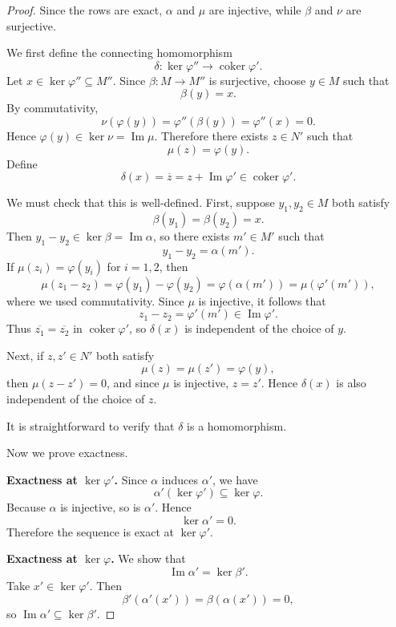 \begin{proof}
    Since the rows are exact, $\alpha$ and $\mu$ are injective, while $\beta$ and $\nu$ are surjective.

    We first define the connecting homomorphism
    \[
        \delta:\ker\varphi''\to \operatorname{coker}\varphi'.
    \]
    Let $x\in \ker\varphi''\subseteq M''$. Since $\beta:M\to M''$ is surjective, choose $y\in M$ such that
    \[
        \beta(y)=x.
    \]
    By commutativity,
    \[
        \nu(\varphi(y))=\varphi''(\beta(y))=\varphi''(x)=0.
    \]
    Hence $\varphi(y)\in \ker\nu=\operatorname{Im}\mu$. Therefore there exists $z\in N'$ such that
    \[
        \mu(z)=\varphi(y).
    \]
    Define
    \[
        \delta(x)=\overline{z}=z+\operatorname{Im}\varphi' \in \operatorname{coker}\varphi'.
    \]

    We must check that this is well-defined. First, suppose $y_1,y_2\in M$ both satisfy
    \[
        \beta(y_1)=\beta(y_2)=x.
    \]
    Then $y_1-y_2\in \ker\beta=\operatorname{Im}\alpha$, so there exists $m'\in M'$ such that
    \[
        y_1-y_2=\alpha(m').
    \]
    If $\mu(z_i)=\varphi(y_i)$ for $i=1,2$, then
    \[
        \mu(z_1-z_2)=\varphi(y_1)-\varphi(y_2)=\varphi(\alpha(m'))
        =\mu(\varphi'(m')),
    \]
    where we used commutativity. Since $\mu$ is injective, it follows that
    \[
        z_1-z_2=\varphi'(m')\in \operatorname{Im}\varphi'.
    \]
    Thus $\overline{z_1}=\overline{z_2}$ in $\operatorname{coker}\varphi'$, so $\delta(x)$ is independent of the choice of $y$.

    Next, if $z,z'\in N'$ both satisfy
    \[
        \mu(z)=\mu(z')=\varphi(y),
    \]
    then $\mu(z-z')=0$, and since $\mu$ is injective, $z=z'$. Hence $\delta(x)$ is also independent of the choice of $z$.

    It is straightforward to verify that $\delta$ is a homomorphism.

    Now we prove exactness.

    \medskip

    \noindent\textbf{Exactness at $\ker\varphi'$.}
    Since $\alpha$ induces $\alpha'$, we have
    \[
        \alpha'(\ker\varphi')\subseteq \ker\varphi.
    \]
    Because $\alpha$ is injective, so is $\alpha'$. Hence
    \[
        \ker\alpha'=0.
    \]
    Therefore the sequence is exact at $\ker\varphi'$.

    \medskip

    \noindent\textbf{Exactness at $\ker\varphi$.}
    We show that
    \[
        \operatorname{Im}\alpha'=\ker\beta'.
    \]
    Take $x'\in \ker\varphi'$. Then
    \[
        \beta'(\alpha'(x'))=\beta(\alpha(x'))=0,
    \]
    so $\operatorname{Im}\alpha'\subseteq \ker\beta'$.


\end{proof}

